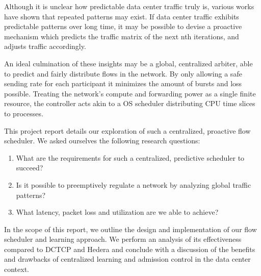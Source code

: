 Although it is unclear how predictable data center traffic truly is, various 
works have shown that repeated patterns may 
exist.\cite{msr_dc,fb_dc,traffic,microte}
If data center traffic exhibits predictable patterns over long time, it may be 
possible to devise a proactive mechanism which predicts the traffic matrix of 
the next nth iterations, and adjusts traffic accordingly.


An ideal culmination of these insights may be a global, 
centralized arbiter, able to predict and fairly distribute flows in the 
network. By only allowing a safe sending rate for each participant it minimizes 
the amount of bursts and loss possible.
Treating the network's compute and forwarding power as a single finite 
resource, the controller acts akin to a OS scheduler distributing CPU time 
slices to processes.

This project report details our exploration of such a centralized, 
proactive flow scheduler. We asked ourselves the following research questions:
\begin{enumerate}
    \item What are the requirements for such a centralized, predictive 
    scheduler to succeed?
    \item Is it possible to preemptively regulate a network by analyzing global 
    traffic patterns?
    \item What latency, packet loss and utilization are we able to achieve?
\end{enumerate}
In the scope of this report, we outline the design and implementation of our 
flow scheduler and learning approach. We perform an analysis of its 
effectiveness compared to DCTCP and Hedera and conclude with a discussion of 
the benefits and drawbacks of centralized learning and admission control in the 
data center context.
